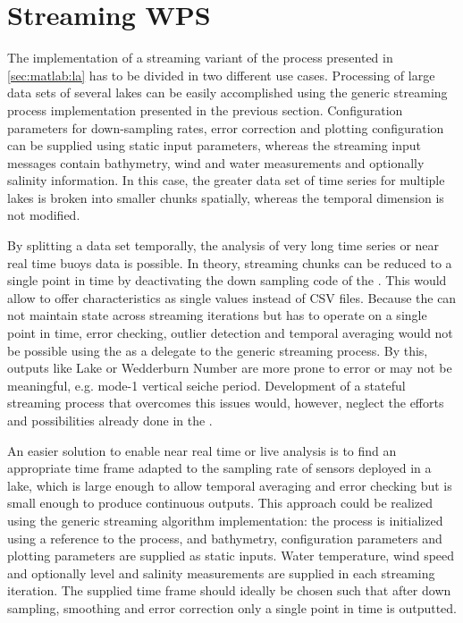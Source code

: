   \section{Streaming \la WPS}
    The implementation of a streaming variant of the \la process presented in \cref{sec:matlab:la} has to be divided in two different use cases. Processing of large data sets of several lakes can be easily accomplished using the generic streaming process implementation presented in the previous section. Configuration parameters for down-sampling rates, error correction and plotting configuration can be supplied using static input parameters, whereas the streaming input messages contain bathymetry, wind and water measurements and optionally salinity information. In this case, the greater data set of time series for multiple lakes is broken into smaller chunks spatially, whereas the temporal dimension is not modified.

    By splitting a data set temporally, the analysis of very long time series or near real time buoys data is possible. In theory, streaming chunks can be reduced to a single point in time by deactivating the down sampling code of the \la. This would allow to offer characteristics as single values instead of \ac{CSV} files. Because the \la can not maintain state across streaming iterations but has to operate on a single point in time, error checking, outlier detection and temporal averaging would not be possible using the \la as a delegate to the generic streaming process. By this, outputs like Lake or Wedderburn Number are more prone to error or may not be meaningful, e.g. mode-1 vertical seiche period. Development of a stateful streaming process that overcomes this issues would, however, neglect the efforts and possibilities already done in the \la.

    An easier solution to enable near real time or live analysis is to find an appropriate time frame adapted to the sampling rate of sensors deployed in a lake, which is large enough to allow temporal averaging and error checking but is small enough to produce continuous outputs. This approach could be realized using the generic streaming algorithm implementation: the process is initialized using a reference to the \la process, and bathymetry, configuration parameters and plotting parameters are supplied as static inputs. Water temperature, wind speed and optionally level and salinity measurements are supplied in each streaming iteration. The supplied time frame should ideally be chosen such that after down sampling, smoothing and error correction only a single point in time is outputted.

